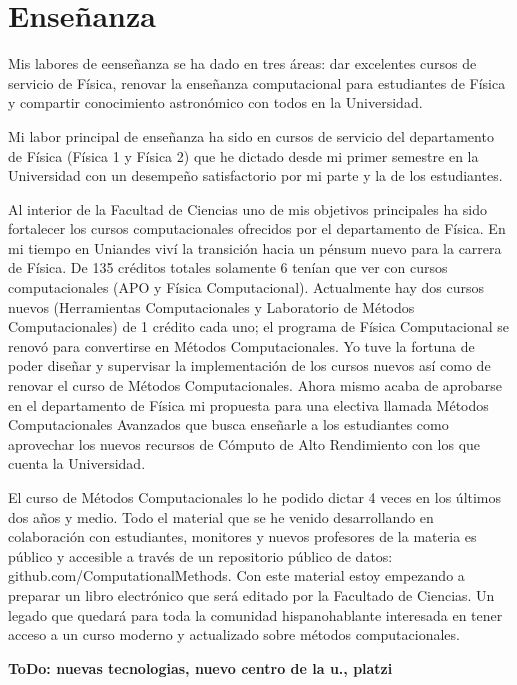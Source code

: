 \documentclass[letterpaper,12pt,onecolumn]{article}
\begin{document}
\section{{\Large{\sc Ense\~nanza}}}

Mis labores de eense\~nanza se ha dado en tres \'areas: dar excelentes
cursos de servicio de F\'isica, renovar la ense\~nanza computacional
para estudiantes de F\'isica y compartir conocimiento astron\'omico
con todos en la Universidad.

Mi labor principal de ense\~nanza ha sido en cursos de servicio del
departamento de F\'isica (F\'isica 1 y F\'isica 2) que he dictado desde mi
primer semestre en la Universidad con un desempe\~no satisfactorio por
mi parte y la de los estudiantes.

Al interior de la Facultad de Ciencias uno de mis objetivos
principales ha sido fortalecer los cursos computacionales ofrecidos por
el departamento de F\'isica. En mi tiempo en Uniandes viv\'i la transici\'on
hacia un p\'ensum nuevo para la carrera de F\'isica. De 135 cr\'editos
totales solamente 6 ten\'ian que ver con cursos computacionales (APO y
F\'isica Computacional). Actualmente hay dos cursos nuevos (Herramientas
Computacionales y Laboratorio de M\'etodos Computacionales) de 1 cr\'edito
 cada uno; el programa de F\'isica Computacional se renov\'o para convertirse en
M\'etodos Computacionales. Yo tuve la fortuna de poder dise\~nar y
supervisar la implementaci\'on de los cursos nuevos as\'i como de renovar
el curso de M\'etodos  Computacionales. Ahora mismo acaba de aprobarse
en el departamento de F\'isica mi propuesta para una electiva llamada
M\'etodos Computacionales Avanzados que busca ense\~narle a los
estudiantes como aprovechar los nuevos  recursos de C\'omputo de Alto
Rendimiento con los que cuenta la Universidad.


El curso de M\'etodos Computacionales lo he podido dictar 4 veces en los
\'ultimos dos a\~nos y medio. Todo el material que se he venido
desarrollando en colaboraci\'on con estudiantes, monitores y nuevos
profesores de la materia es p\'ublico y accesible a trav\'es de un
repositorio p\'ublico de datos: github.com/ComputationalMethods.
Con este material estoy empezando a preparar un libro electr\'onico que
ser\'a editado por la Facultado de Ciencias. Un legado que quedar\'a para
toda la comunidad hispanohablante interesada en tener acceso a un
curso moderno y actualizado sobre m\'etodos computacionales.

{\bf ToDo: nuevas tecnologias, nuevo centro de la u., platzi}
\end{document}
